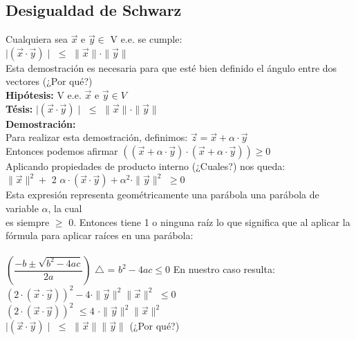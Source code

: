 \documentclass{article}
\begin{document}
\subsection{Desigualdad de Schwarz}
Cualquiera sea $\vec{x}$ e $\vec{y} \in $ V e.e. se cumple: \\
$\mid(\vec{x}\cdot\vec{y})\mid$ $\leq$ $\parallel\vec{x}\parallel \cdot \parallel\vec{y}\parallel $ \\
Esta demostración es necesaria para que esté bien definido el ángulo entre dos vectores (¿Por qué?)\\
\textbf{Hipótesis:} V e.e. $\vec{x}$ e $\vec{y} \in V$ \\
\textbf{Tésis:} $\mid(\vec{x}\cdot\vec{y})\mid$ $\leq$ $\parallel\vec{x}\parallel \cdot \parallel\vec{y}\parallel $ \\
\textbf {Demostración:} \\
Para realizar esta demostración, definimos: $\vec{z} = \vec{x} + \alpha\cdot\vec{y}$ \\
Entonces podemos afirmar $((\vec{x} + \alpha\cdot\vec{y})\cdot(\vec{x} + \alpha\cdot\vec{y})) \geq 0$\\
Aplicando propiedades de producto interno (¿Cuales?) nos queda: \\
$\parallel\vec{x}\parallel^2 +$ 2 $\alpha\cdot(\vec{x}\cdot\vec{y}) + \alpha^2 \cdot \parallel\vec{y}\parallel^2$ $\geq 0$
\\
Esta expresión representa geométricamente una parábola una parábola de variable $\alpha$, la cual \\ es siempre $\geq$ 0. Entonces tiene 1 o ninguna raíz lo que significa que al aplicar la fórmula para aplicar raíces en una parábola:\\\\
$(\dfrac{-b\pm\sqrt{b^2-4ac}}{2a})$ \indent $\bigtriangleup$ = $b^2-4ac \leq 0$
\newpage
\noindent En nuestro caso resulta: \\
$(2\cdot(\vec{x}\cdot\vec{y}))^2 -4 \cdot \parallel\vec{y}\parallel^2 \parallel\vec{x}\parallel^2$  $\leq 0$\\
$(2\cdot(\vec{x}\cdot\vec{y}))^2$ $\leq 4$ $\cdot \parallel\vec{y}\parallel^2 \parallel\vec{x}\parallel^2$ \\
$\mid(\vec{x}\cdot\vec{y})\mid$ $\leq$ $\parallel\vec{x}\parallel \parallel\vec{y}\parallel$ (¿Por qué?)
\end{document}
